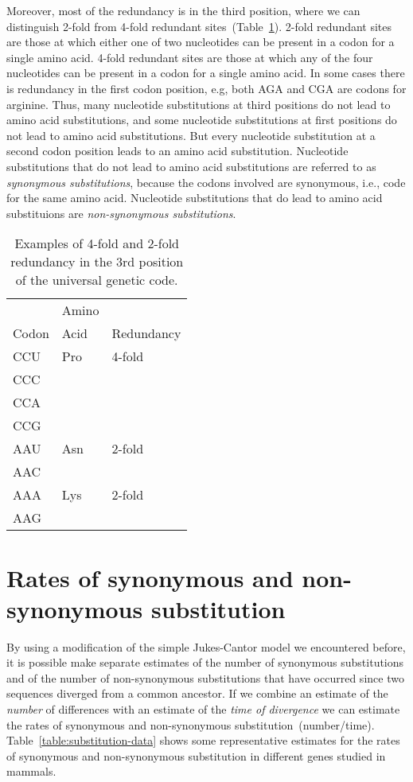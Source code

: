 Moreover, most of the redundancy is in the third position, where we
can distinguish 2-fold from 4-fold redundant
sites~(Table~\ref{table:fold}). 2-fold redundant sites are those at
which either one of two nucleotides can be present in a codon for a
single amino acid. 4-fold redundant sites are those at which any of
the four nucleotides can be present in a codon for a single amino
acid. In some cases there is redundancy in the first codon position,
e.g, both AGA and CGA are codons for arginine. Thus, many nucleotide
substitutions at third positions do not lead to amino acid
substitutions, and some nucleotide substitutions at first positions do
not lead to amino acid substitutions. But every nucleotide
substitution at a second codon position leads to an amino acid
substitution. Nucleotide substitutions that do not lead to amino acid
substitutions are referred to as {\it synonymous substitutions},
because the codons involved are synonymous, i.e., code for the same
amino acid. Nucleotide substitutions that do lead to amino acid
substituions are {\it non-synonymous substitutions}. 

\begin{table}
\begin{center}
\begin{tabular}{lll}
\hline\hline
      & Amino & \\
Codon & Acid  & Redundancy \\
\hline
CCU   & Pro   & 4-fold \\
CCC \\
CCA \\
CCG \\
\hline
AAU   & Asn   & 2-fold \\
AAC \\
AAA   & Lys   & 2-fold \\
AAG \\
\hline
\end{tabular}
\end{center}
\caption{Examples of 4-fold and 2-fold redundancy in the 3rd position
  of the universal genetic code.}\label{table:fold}
\end{table}

\section*{Rates of synonymous and non-synonymous substitution}

By using a modification of the simple Jukes-Cantor model we
encountered before, it is possible make separate estimates of the
number of synonymous substitutions and of the number of non-synonymous
substitutions that have occurred since two sequences diverged from a
common ancestor. If we combine an estimate of the {\it number\/} of
differences with an estimate of the {\it time of divergence\/} we can
estimate the rates of synonymous and non-synonymous
substitution~(number/time). Table~\ref{table:substitution-data} shows some
representative estimates for the rates of synonymous and
non-synonymous substitution in different genes studied in
mammals.

